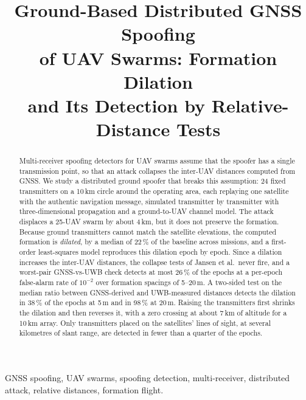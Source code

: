 \documentclass[conference]{IEEEtran}
\newcommand{\todo}[1]{\textcolor{red}{\textbf{[TODO: #1]}}}
\begin{document}
\title{Ground-Based Distributed GNSS Spoofing\\
of UAV Swarms: Formation Dilation\\
and Its Detection by Relative-Distance Tests}

\author{%
\IEEEauthorblockA{\todo{affiliazione, email}}%
}

\maketitle

\begin{abstract}
Multi-receiver spoofing detectors for UAV swarms assume that the spoofer
has a single transmission point, so that an attack collapses the
inter-UAV distances computed from GNSS. We study a distributed ground
spoofer that breaks this assumption: 24 fixed transmitters on a 10\,km
circle around the operating area, each replaying one satellite with the
authentic navigation message, simulated transmitter by transmitter with
three-dimensional propagation and a ground-to-UAV channel model. The
attack displaces a 25-UAV swarm by about 4\,km, but it does not preserve
the formation. Because ground transmitters cannot match the satellite
elevations, the computed formation is \emph{dilated}, by a median of
22\,\% of the baseline across missions, and a first-order least-squares
model reproduces this dilation epoch by epoch. Since a dilation increases the
inter-UAV distances, the collapse tests of Jansen et al.\ never fire, and
a worst-pair GNSS-vs-UWB check detects at most 26\,\% of the epochs at a
per-epoch false-alarm rate of $10^{-2}$ over formation spacings of
5--20\,m. A two-sided test on the median ratio between GNSS-derived and
UWB-measured distances detects the dilation in 38\,\% of the epochs at
5\,m and in 98\,\% at 20\,m. Raising the transmitters first shrinks the
dilation and then reverses it, with a zero crossing at about 7\,km of
altitude for a 10\,km array. Only transmitters placed on the satellites'
lines of sight, at several kilometres of slant range, are detected in
fewer than a quarter of the epochs.
\end{abstract}

\begin{IEEEkeywords}
GNSS spoofing, UAV swarms, spoofing detection, multi-receiver, distributed
attack, relative distances, formation flight.
\end{IEEEkeywords}
\end{document}
